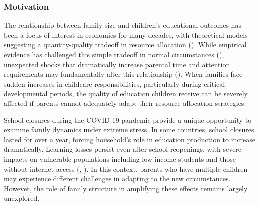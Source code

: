 





\subsubsection{Motivation}

The relationship between family size and children's educational outcomes has been a focus of interest in economics for many decades, with theoretical models suggesting a quantity-quality tradeoff in resource allocation (\cite{becker_child_1976}). While empirical evidence has challenged this simple tradeoff in normal circumstances (\cite{black_more_2005}), unexpected shocks that dramatically increase parental time and attention requirements may fundamentally alter this relationship (\cite{black_recent_2010}). When families face sudden increases in childcare responsibilities, particularly during critical developmental periods, the quality of education children receive can be severely affected if parents cannot adequately adapt their resource allocation strategies.


School closures during the COVID-19 pandemic provide a unique opportunity to examine family dynamics under extreme stress. In some countries, school closures lasted for over a year, forcing household's role in education production to increase dramatically. Learning losses persist even after school reopenings, with severe impacts on vulnerable populations including low-income students and those without internet access (\cite{haelermans_inequality_2022}, \cite{jakubowski_global_2023}). In this context, parents who have multiple children may experience different challenges in adapting to the new circumstances. However, the role of family structure in amplifying these effects remains largely unexplored.\textbf{}

